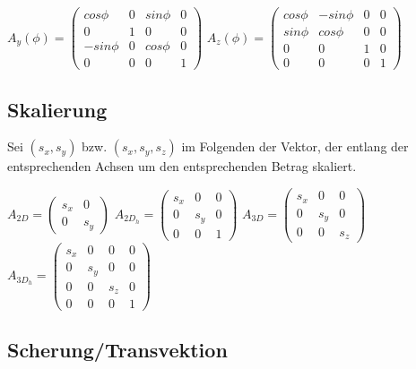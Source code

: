 \documentclass[10pt,a4paper]{article}
\begin{document}
	$A_{y}(\phi) = \begin{pmatrix}cos \phi & 0 & sin \phi& 0\\0 & 1 & 0& 0\\-sin \phi & 0 & cos \phi & 0\\ 0 & 0 & 0 & 1\end{pmatrix}$
	$A_{z}(\phi) = \begin{pmatrix}cos \phi & -sin \phi & 0& 0\\ sin \phi & cos \phi & 0 & 0\\ 0 & 0 & 1 & 0\\ 0 & 0 & 0 & 1\end{pmatrix}$

	\newpage
	\subsection{Skalierung}
	\label{tf:sub:skalierung}
	
	Sei $(s_x, s_y)$ bzw. $(s_x, s_y, s_z)$ im Folgenden der Vektor, der entlang der entsprechenden Achsen um den entsprechenden Betrag skaliert.

	\begin{center}
		$A_{2D} = \begin{pmatrix} s_x & 0\\0 & s_y\end{pmatrix}$\hfill
		$A_{2D_h} = \begin{pmatrix} s_x & 0 & 0\\0 & s_y & 0 \\ 0 & 0 & 1\end{pmatrix}$\hfill
		$A_{3D} = \begin{pmatrix} s_x & 0 & 0\\0 & s_y & 0\\0 & 0 & s_z\end{pmatrix}$\hfill
		$A_{3D_h} = \begin{pmatrix} s_x & 0 & 0 & 0\\0 & s_y & 0 & 0\\0 & 0 & s_z & 0 \\ 0 & 0 & 0 & 1\end{pmatrix}$\hfill
	\end{center}

	\subsection{Scherung/Transvektion}
	\label{tf:sub:scherung_transvektion}
	
\end{document}
